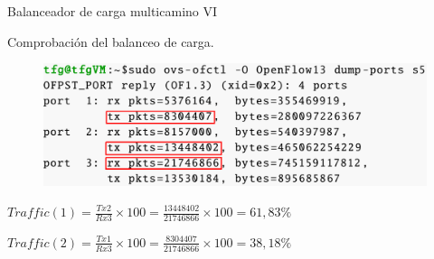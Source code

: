 \documentclass[10pt,spanish,xcolor={svgnames}]{beamer}
\newcommand{\nologo}{\setbeamertemplate{logo}{}} %
\begin{document}
{\nologo %
\begin{frame}{Balanceador de carga multicamino VI}
\begin{exampleblock}{\centering Comprobación del balanceo de carga.}
\begin{figure}[h!]
	\centering
	\includegraphics[width=1\textwidth]{Imagenes/dump_ports_balanceado.png}
\end{figure}
\end{exampleblock}
\begin{center}
	\begin{description}%
		\large
		\item[\textit{Ruta 1}]  $Traffic(1)=\frac{Tx2}{Rx3}\times{100}=\frac{13448402}{21746866}\times{100}=61,83\% $
	
		\item[\textit{Ruta 2}] $Traffic(2)=\frac{Tx1}{Rx3}\times{100}=\frac{8304407}{21746866}\times{100}=38,18\% $
	\end{description}
\end{center}

\end{frame}
} %
\end{document}
